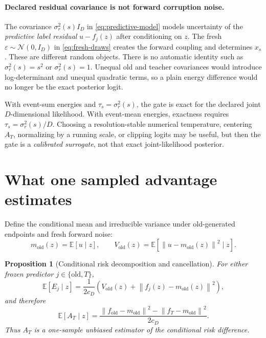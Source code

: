 \documentclass[11pt,a4paper]{article}
\newcommand{\E}{\mathbb{E}}
\newcommand{\N}{\mathcal{N}}
\newcommand{\norm}[1]{\left\lVert #1\right\rVert}
\newcommand{\old}{\mathrm{old}}
\theoremstyle{plain}
\newtheorem{proposition}[theorem]{Proposition}
\theoremstyle{definition}
\begin{document}
\paragraph{Declared residual covariance is not forward corruption noise.}
The covariance $\sigma_r^2(s)I_D$ in \eqref{eq:predictive-model} models uncertainty of the
\emph{predictive label residual} $u-f_j(z)$ after conditioning on $z$.  The fresh
$\varepsilon\sim\N(0,I_D)$ in \eqref{eq:fresh-draws} creates the forward coupling and determines
$x_s$.  These are different random objects.  There is no automatic identity such as
$\sigma_r^2(s)=s^2$ or $\sigma_r^2(s)=1$.  Unequal old and teacher covariances would introduce
log-determinant and unequal quadratic terms, so a plain energy difference would no longer be the
exact posterior logit.

\begin{tcolorbox}[colback=yellow!5,colframe=yellow!50!black,title=Exact likelihood versus calibrated surrogate]
With event-sum energies and $\tau_s=\sigma_r^2(s)$, the gate is exact for the declared joint
$D$-dimensional likelihood.  With event-mean energies, exactness requires
$\tau_s=\sigma_r^2(s)/D$.  Choosing a resolution-stable numerical temperature, centering $A_T$,
normalizing by a running scale, or clipping logits may be useful, but then the gate is a
\emph{calibrated surrogate}, not that exact joint-likelihood posterior.
\end{tcolorbox}

\section{What one sampled advantage estimates}
\label{sec:risk}

Define the conditional mean and irreducible variance under old-generated endpoints and fresh
forward noise:
\begin{equation}
m_{\old}(z)=\E[u\mid z],
\qquad
V_{\old}(z)=\E[\norm{u-m_{\old}(z)}^2\mid z].
\label{eq:conditional-moments}
\end{equation}

\begin{proposition}[Conditional risk decomposition and cancellation]
\label{prop:risk}
For either frozen predictor $j\in\{\old,T\}$,
\begin{equation}
\E[E_j\mid z]
=\frac{1}{2c_D}
\left(V_{\old}(z)+\norm{f_j(z)-m_{\old}(z)}^2\right),
\label{eq:risk-decomposition}
\end{equation}
and therefore
\begin{equation}
\E[A_T\mid z]
=\frac{\norm{f_{\old}-m_{\old}}^2-\norm{f_T-m_{\old}}^2}{2c_D}.
\label{eq:mean-advantage}
\end{equation}
Thus $A_T$ is a one-sample unbiased estimator of the conditional risk difference.
\end{proposition}
\end{document}
